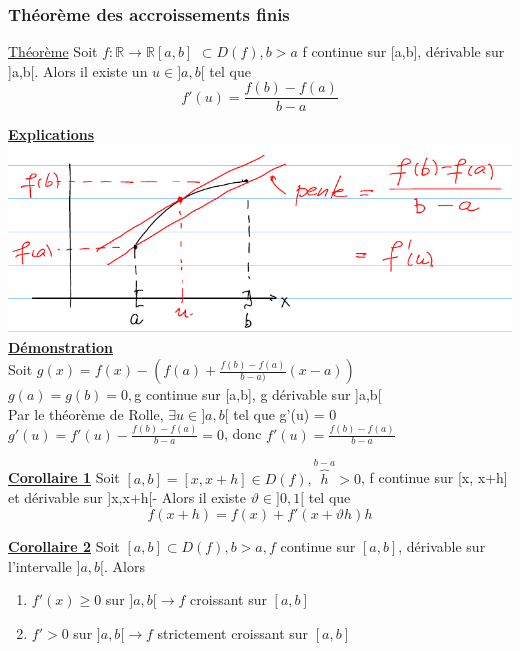 \documentclass[12pt,a4paper]{article}
\newcommand{\evid}[1]{\textbf{\underline{#1}}}
\newcommand{\R}{\ensuremath{\mathbb{R}} }
\newcommand{\rtor}{\ensuremath{\R \to \R} }
\newcommand{\Theoreme}{\underline{Théorème} }
\begin{document}
{\subsubsection{Théorème des accroissements finis}
\begin{boite}
	\Theoreme Soit $f:\rtor [a,b]$ $\subset D(f), b > a$ f continue sur [a,b], dérivable sur ]a,b[. Alors il existe un $u \in ]a,b[$ tel que 
	\begin{equation}
		f'(u) = \frac{f(b)-f(a)}{b-a}
	\end{equation}
\end{boite}
\evid{Explications}\\
 \includegraphics[scale=0.7]{illustrations_Analyse/acc_finis}\\
\evid{Démonstration}\\
Soit $g(x) = f(x) - (f(a) + \frac{f(b)-f(a)}{b-a)}(x-a))$\\
$g(a)=g(b) = 0, $g continue sur [a,b], g dérivable sur ]a,b[\\
Par le théorème de Rolle, $\exists u \in ]a,b[$ tel que g'(u) = 0\\
$g'(u) = f'(u) - \frac{f(b)-f(a)}{b-a} = 0$, donc $f'(u) = \frac{f(b)-f(a)}{b-a}$\\
\begin{boite}
\evid{Corollaire 1} Soit $[a,b] = [x,x+h] \in D(f), \overbrace{h}^{b-a} > 0$, f continue sur [x, x+h] 
et dérivable sur ]x,x+h[- Alors il existe $\vartheta \in ]0,1[$ tel que
\begin{equation}
f(x+h) = f(x) + f'(x + \vartheta h)h
\end{equation}
\end{boite}
\begin{boite}
	\evid{Corollaire 2} Soit $[a,b] \subset D(f), b > a, f$ continue sur $[a,b]$, dérivable sur l'intervalle $]a,b[$. Alors
	\begin{enumerate}[label=\roman*)]
		\item $f'(x) \geq 0$ sur $]a,b[ \to f$ croissant sur $[a,b]$
		\item $f' > 0 $ sur $]a,b[\to f$ strictement croissant sur $[a,b]$

\end{enumerate}
\end{boite}}
\end{document}
